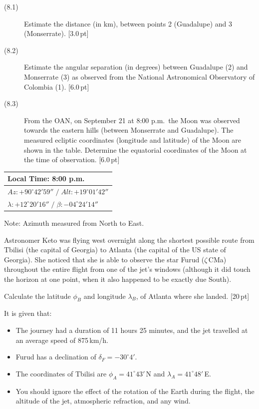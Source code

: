 \begin{description}
\item[(8.1)] Estimate the distance (in km), between points 2 (Guadalupe) and 3
  (Monserrate). \hfill[3.0\,pt]
\item[(8.2)] Estimate the angular separation (in degrees) between Guadalupe (2)
  and Monserrate (3) as observed from the National Astronomical Observatory of
  Colombia (1). \hfill[6.0\,pt]
\item[(8.3)] From the OAN, on September 21 at 8:00 p.m.\ the Moon was observed
  towards the eastern hills (between Monserrate and Guadalupe). The measured
  ecliptic coordinates (longitude and latitude) of the Moon are shown in the
  table. Determine the equatorial coordinates of the Moon at the time of
  observation. \hfill[6.0\,pt]
\end{description}


\begin{center}
\begin{tabular}{|l|}
\hline
\textbf{Local Time: 8:00 p.m.} \\
\hline
$Az: +90^\circ 42' 59''\;/\;Alt: +19^\circ 01' 42''$ \\
\hline
$\lambda: +12^\circ 20' 16''\;/\;\beta: -04^\circ 24' 14''$ \\
\hline
\end{tabular}
\end{center}

Note: Azimuth measured from North to East.

Astronomer Keto was flying west overnight along the shortest possible route
from Tbilisi (the capital of Georgia) to Atlanta (the capital of the US state
of Georgia). She noticed that she is able to observe the star Furud
($\zeta$\,CMa) throughout the entire flight from one of the jet's windows
(although it did touch the horizon at one point, when it also happened to be
exactly due South).

Calculate the latitude $\phi_B$ and longitude $\lambda_B$, of Atlanta where she
landed. \hfill[20\,pt]

It is given that:
\begin{itemize}
\item The journey had a duration of 11 hours 25 minutes, and the jet travelled
  at an average speed of 875\,km/h.
\item Furud has a declination of $\delta_F = -30^\circ 4'$.
\item The coordinates of Tbilisi are $\phi_A = 41^\circ 43'$\,N and
  $\lambda_A = 41^\circ 48'$\,E.
\item You should ignore the effect of the rotation of the Earth during the
  flight, the altitude of the jet, atmospheric refraction, and any wind.
\end{itemize}

